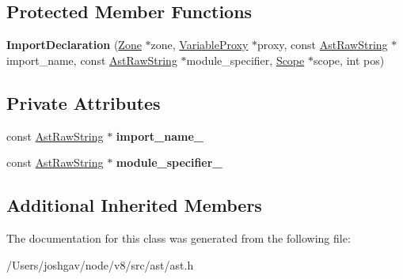 \subsection*{Protected Member Functions}
\begin{DoxyCompactItemize}
\item 
{\bfseries Import\+Declaration} (\hyperlink{classv8_1_1internal_1_1_zone}{Zone} $\ast$zone, \hyperlink{classv8_1_1internal_1_1_variable_proxy}{Variable\+Proxy} $\ast$proxy, const \hyperlink{classv8_1_1internal_1_1_ast_raw_string}{Ast\+Raw\+String} $\ast$import\+\_\+name, const \hyperlink{classv8_1_1internal_1_1_ast_raw_string}{Ast\+Raw\+String} $\ast$module\+\_\+specifier, \hyperlink{classv8_1_1internal_1_1_scope}{Scope} $\ast$scope, int pos)\hypertarget{classv8_1_1internal_1_1_import_declaration_ad8abd0dd3efe4d6fd5b4e434e494015a}{}\label{classv8_1_1internal_1_1_import_declaration_ad8abd0dd3efe4d6fd5b4e434e494015a}

\end{DoxyCompactItemize}
\subsection*{Private Attributes}
\begin{DoxyCompactItemize}
\item 
const \hyperlink{classv8_1_1internal_1_1_ast_raw_string}{Ast\+Raw\+String} $\ast$ {\bfseries import\+\_\+name\+\_\+}\hypertarget{classv8_1_1internal_1_1_import_declaration_a73a9fb0ca997f46cee31c0f33872e333}{}\label{classv8_1_1internal_1_1_import_declaration_a73a9fb0ca997f46cee31c0f33872e333}

\item 
const \hyperlink{classv8_1_1internal_1_1_ast_raw_string}{Ast\+Raw\+String} $\ast$ {\bfseries module\+\_\+specifier\+\_\+}\hypertarget{classv8_1_1internal_1_1_import_declaration_a97a57a06b1a742e9ce056a3adbbf6825}{}\label{classv8_1_1internal_1_1_import_declaration_a97a57a06b1a742e9ce056a3adbbf6825}

\end{DoxyCompactItemize}
\subsection*{Additional Inherited Members}


The documentation for this class was generated from the following file\+:\begin{DoxyCompactItemize}
\item 
/\+Users/joshgav/node/v8/src/ast/ast.\+h\end{DoxyCompactItemize}
